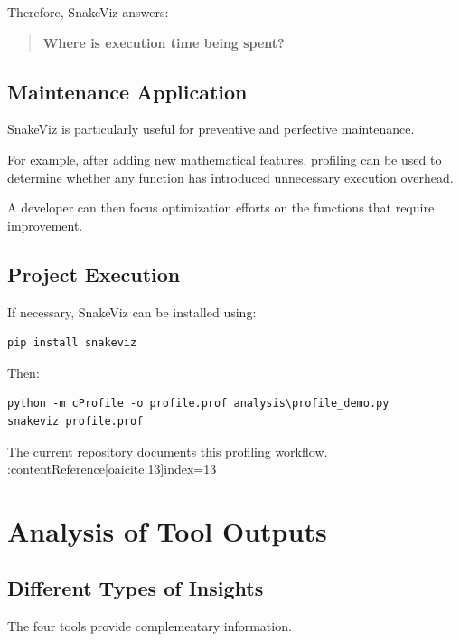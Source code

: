 \documentclass[12pt,a4paper]{report}
\begin{document}
Therefore, SnakeViz answers:

\begin{quote}
\textbf{Where is execution time being spent?}
\end{quote}

\section{Maintenance Application}

SnakeViz is particularly useful for preventive and perfective
maintenance.

For example, after adding new mathematical features, profiling can be
used to determine whether any function has introduced unnecessary
execution overhead.

A developer can then focus optimization efforts on the functions that
require improvement.

\section{Project Execution}

If necessary, SnakeViz can be installed using:

\begin{lstlisting}
pip install snakeviz
\end{lstlisting}

Then:

\begin{lstlisting}
python -m cProfile -o profile.prof analysis\profile_demo.py
snakeviz profile.prof
\end{lstlisting}

The current repository documents this profiling workflow. :contentReference[oaicite:13]{index=13}


\chapter{Analysis of Tool Outputs}

\section{Different Types of Insights}

The four tools provide complementary information.
\end{document}
